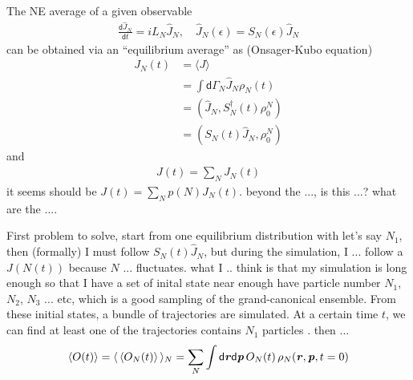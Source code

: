 \documentclass[aps,pre,preprint]{revtex4-1}
\newcommand{\bluec}[1]{{\color{blue} #1}}
\renewcommand{\v}[1]{\textbf{\textit{#1}}}
\renewcommand{\d}[1]{\textsf{#1}}
\begin{document}
The NE average of a given observable
\begin{align}
  \frac{\d d\hat J_N}{\d dt} = i L_N\hat J_N,
  \quad \hat J_N(\epsilon) = S_N(\epsilon)\hat J_N
\end{align}
can be obtained via an ``equilibrium average'' as (Onsager-Kubo equation)
\begin{align}\nonumber
  J_N(t)
  & = \langle J\rangle \\\nonumber
  & = \int\d d \Gamma_N \hat J_N\rho_N(t)\\\nonumber
  & = (\hat J_N, S_N^\dagger(t)\rho_0^N) \\\nonumber
  & = (S_N(t)\hat J_N, \rho_0^N)
\end{align}
and
\begin{align}
  J(t) = \sum_N J_N(t)
\end{align}
\bluec{it seems should be $J(t) = \sum_Np(N)J_N(t)$.} beyond the \bluec{...}, is this
\bluec{...}? what are the {...}.

First problem to solve, start from one equilibrium distribution with let's say $N_1$,
then (formally) I must follow $S_N(t)\hat J_N$, but during the simulation, I ... follow
a $J(N(t))$ because $N$ ... fluctuates.
what I .. think is that my simulation is long enough so that I have
\bluec{a set of inital state near enough have particle number $N_1$,
  $N_2$, $N_3$ ... etc, which is a good sampling of the
  grand-canonical ensemble. From these initial states, a bundle of
  trajectories are simulated. At a certain time $t$, we can find at
  least one of the trajectories contains $N_1$ particles }.  then ...
\begin{align}
  \langle O(t)\rangle
  = \langle\,\langle O_N(t)\rangle\,\rangle_N
  = \sum_N\int\d d\v r\d d\v p \,O_N(t)\, \rho_N(\v r, \v p, t=0)
\end{align}



% 
\end{document}
